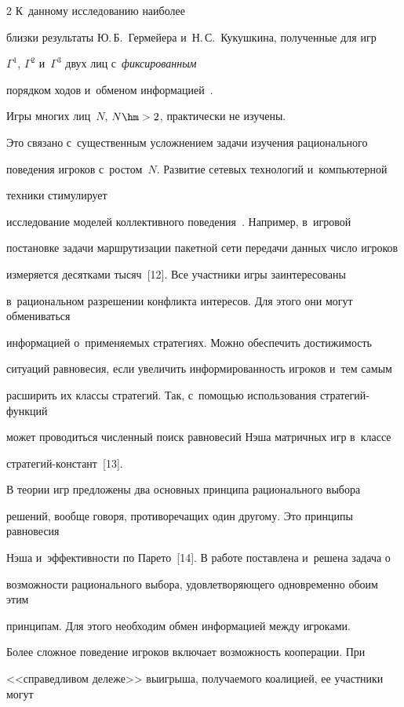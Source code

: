 \begin{multicols}{2}
К~данному исследованию наиболее

близки результаты Ю.\,Б.~Гермейера и~Н.\,С.~Кукушкина, полученные для игр

$\Gamma^1$, $\Gamma^2$ и~$\Gamma^3$ двух лиц с~\textit{фиксированным}

порядком ходов и~обменом информацией~\cite{1-vas, 4-vas}.



    Игры многих лиц~$N$, $N\hm>2$, практически не изуче\-ны.

    Это связано с~существенным усложнением задачи изучения рационального

    поведения игроков с~ростом~$N$. Развитие сетевых технологий и~компьютерной

    техники стимулирует

исследование моделей коллективного поведения~\cite{11-vas}. Например, в~игровой

постановке задачи маршрутизации пакетной сети передачи данных число игроков

измеряется десятками тысяч~[12]. Все участники игры заинтересованы

в~рациональном разрешении конфликта интересов. Для этого они могут обмениваться

информацией о~применяемых стратегиях. Можно обеспечить достижимость

ситуаций равновесия, если увеличить информированность игроков и~тем самым

расширить их классы стратегий. Так, с~помощью использования стратегий-функций

может проводиться численный поиск равновесий Нэша матричных игр в~классе

стратегий-констант~[13].



    В теории игр предложены два основных принципа рационального выбора

решений, вообще говоря, противоречащих один другому. Это принципы равновесия

Нэша и~эффективности по Парето~[14]. В работе поставлена и~решена задача о

возможности рационального выбора, удовлетворяющего одновременно обоим этим

принципам. Для этого необходим обмен информацией между игроками.



    Более сложное поведение игроков включает возмож\-ность кооперации. При

<<справедливом дележе>> выигрыша, получаемого коалицией, ее участники могут


\end{multicols}
